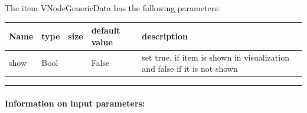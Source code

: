 \noindent The item VNodeGenericData has the following parameters:
\begin{center}
  \footnotesize
  \begin{longtable}{| p{4.5cm} | p{2.5cm} | p{0.5cm} | p{2.5cm} | p{6cm} |}
    \hline
    \bf Name & \bf type & \bf size & \bf default value & \bf description \\ \hline
    show &     Bool &      &     False &     set true, if item is shown in visualization and false if it is not shown\\ \hline
\end{longtable}
\end{center}
\par\noindent\rule{\textwidth}{0.4pt}
\label{description_NodeGenericData}
\paragraph{Information on input parameters:} 
\finishTable

